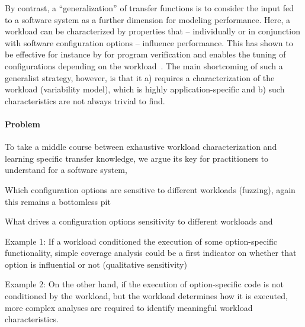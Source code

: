 By contrast, a “generalization” of transfer functions is to consider the input fed to a software system as a further dimension for modeling performance. Here,  a workload can be characterized by properties that – individually or in conjunction with software configuration options – influence performance. This has shown to be effective for instance by \citeauthor{koc_satune_2021} for program verification and enables the tuning of configurations depending on the workload~\cite{koc_satune_2021}. The main shortcoming of such a generalist strategy, however, is that it a) requires a characterization of the workload (variability model), which is highly application-specific and b) such characteristics are not always trivial to find.

\paragraph{Problem}To take a middle course between exhaustive workload characterization and learning specific transfer knowledge, we argue its key for practitioners to understand for a software system,

\begin{compactitem}
	\item Which configuration options are sensitive to different workloads (fuzzing), again this remains a bottomless pit
	\item What drives a configuration options sensitivity to different workloads and
	\begin{compactitem}
		\item Example 1: If a workload conditioned the execution of some option-specific functionality, simple coverage analysis could be a first indicator on whether that option is influential or not (qualitative sensitivity)
		\item Example 2: On the other hand, if the execution of option-specific code is not conditioned by the workload, but the workload determines how it is executed, more complex analyses are required to identify meaningful workload characteristics.  
	\end{compactitem}
\end{compactitem}